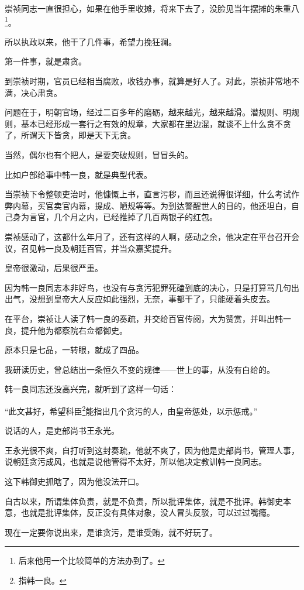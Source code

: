 \begin{multicols}{\theparacolNo}
		崇祯同志一直很担心，如果在他手里收摊，将来下去了，没脸见当年摆摊的朱重八\footnote{后来他用一个比较简单的方法办到了。}。

		所以执政以来，他干了几件事，希望力挽狂澜。

		第一件事，就是肃贪。

		到崇祯时期，官员已经相当腐败，收钱办事，就算是好人了。对此，崇祯非常地不满，决心肃贪。

		问题在于，明朝官场，经过二百多年的磨砺，越来越光，越来越滑。潜规则、明规则，基本已经形成一套行之有效的规章，大家都在里边混，就谈不上什么贪不贪了，所谓天下皆贪，即是天下无贪。

		当然，偶尔也有个把人，是要突破规则，冒冒头的。

		比如户部给事中韩一良，就是典型代表。

		当崇祯下令整顿吏治时，他慷慨上书，直言污秽，而且还说得很详细，什么考试作弊内幕，买官卖官内幕，提成、陋规等等。为到达警醒世人的目的，他还坦白，自己身为言官，几个月之内，已经推掉了几百两银子的红包。

		崇祯感动了，这都什么年月了，还有这样的人啊，感动之余，他决定在平台召开会议，召见韩一良及朝廷百官，并当众嘉奖提升。

		皇帝很激动，后果很严重。

		因为韩一良同志本非好鸟，也没有与贪污犯罪死磕到底的决心，只是打算骂几句出出气，没想到皇帝大人反应如此强烈，无奈，事都干了，只能硬着头皮去。

		在平台，崇祯让人读了韩一良的奏疏，并交给百官传阅，大为赞赏，并叫出韩一良，提升他为都察院右佥都御史。

		原本只是七品，一转眼，就成了四品。

		我研读历史，曾总结出一条恒久不变的规律——世上的事，从没有白给的。

		韩一良同志还没高兴完，就听到了这样一句话：

		“此文甚好，希望科臣\footnote{指韩一良。}能指出几个贪污的人，由皇帝惩处，以示惩戒。”

		说话的人，是吏部尚书王永光。

		王永光很不爽，自打听到这封奏疏，他就不爽了，因为他是吏部尚书，管理人事，说朝廷贪污成风，也就是说他管得不太好，所以他决定教训韩一良同志。

		这下韩御史抓瞎了，因为他没法开口。

		自古以来，所谓集体负责，就是不负责，所以批评集体，就是不批评。韩御史本意，也就是批评集体，反正没有具体对象，没人冒头反驳，可以过过嘴瘾。

		现在一定要你说出来，是谁贪污，是谁受贿，就不好玩了。


\end{multicols}
